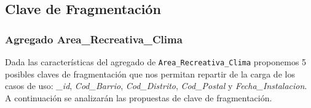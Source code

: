 \documentclass[]{article}
\begin{document}
\newpage

\subsection{Clave de Fragmentación}
\label{subsec:fragmmentacion}

\subsubsection{Agregado Area\_Recreativa\_Clima}
\label{subsubsec:fragmentacion_area}
Dada las características del agregado de \texttt{Area\_Recreativa\_Clima} proponemos 5 posibles claves de fragmentación que nos permitan repartir de la carga de los casos de uso: \textit{\_id}, \textit{Cod\_Barrio}, \textit{Cod\_Distrito}, \textit{Cod\_Postal} y \textit{Fecha\_Instalacion}. A continuación se analizarán las propuestas de clave de fragmentación.
\end{document}
